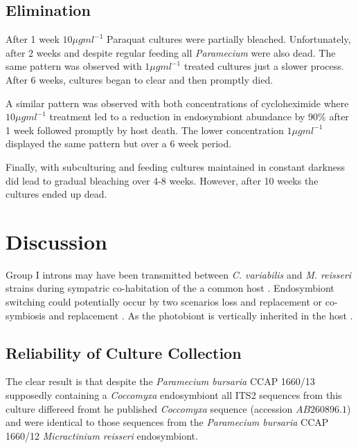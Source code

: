 \subsection{Elimination}

After 1 week \(10\mu g ml^{-1}\) Paraquat cultures were partially bleached. 
Unfortunately, after 2 weeks and despite regular feeding all \textit{Paramecium}
were also dead. The same pattern was observed with \(1\mu g ml^{-1}\) treated
cultures just a slower process.   After 6 weeks, cultures began to clear
and then promptly died. 

A similar pattern was observed with both concentrations of
cycloheximide where \(10\mu g ml^{-1}\) treatment 
led to a reduction in endosymbiont abundance by 90\%
after 1 week followed promptly by host death. 
The lower concentration \(1\mu g ml^{-1}\) 
displayed the same pattern but over a 6 week period.

Finally, with subculturing and feeding cultures maintained in 
constant darkness did lead to gradual bleaching over 4-8 weeks.
However, after 10 weeks the cultures ended up dead. 


\section{Discussion}

Group I introns may have been transmitted between \textit{C. variabilis}
and \textit{M. reisseri} strains during sympatric co-habitation
of the a common host \citep{Hoshina2012}. 
Endosymbiont switching could potentially occur by two scenarios
loss and replacement or co-symbiosis and replacement \citep{Hoshina2012}.
As the photobiont is vertically inherited in the host
\citep{Siegel1960}. 



\subsection{Reliability of Culture Collection}

The clear result is that despite the \textit{Paramecium bursaria} CCAP 1660/13
supposedly containing a \textit{Coccomyxa} endosymbiont 
all ITS2 sequences from this culture differeed fromt he published
\textit{Coccomyxa} sequence (accession \(AB260896.1\)) and were identical
to those sequences from the \textit{Paramecium bursaria} CCAP 1660/12 \textit{Micractinium
reisseri} endosymbiont.



